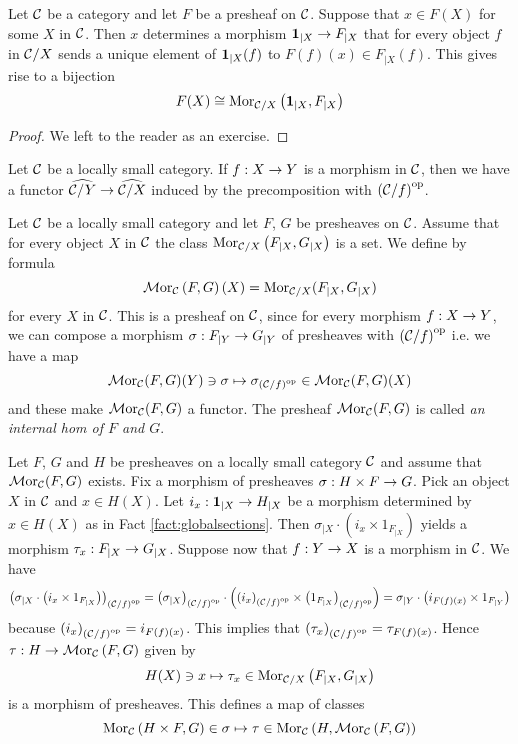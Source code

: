 \begin{fact}\label{fact:globalsections}
Let ${\mathcal C}$ be a category and let $F$ be a presheaf on ${\mathcal C}$. Suppose that $x\in F(X)$ for some $X$ in ${\mathcal C}$. Then $x$ determines a morphism $\mathbf{1}_{\mid X}\rightarrow F_{\mid X}$ that for every object $f$ in ${\mathcal C}/X$ sends a unique element of $\mathbf{1}_{\mid X}(f)$ to $F(f)(x)\in F_{\mid X}(f)$. This gives rise to a bijection
$$F(X)\cong \mathrm{Mor}_{{\mathcal C}/X}\left(\mathbf{1}_{\mid X},F_{\mid X}\right)$$
\end{fact}
\begin{proof}
We left to the reader as an exercise.
\end{proof}
\noindent
Let ${\mathcal C}$ be a locally small category. If $f:X\rightarrow Y$ is a morphism in ${\mathcal C}$, then we have a functor $\widehat{{\mathcal C}/Y}\rightarrow \widehat{{\mathcal C}/X}$ induced by the precomposition with $\left({\mathcal C}/f\right)^{\mathrm{op}}$.

\begin{definition}
Let ${\mathcal C}$ be a locally small category and let $F$, $G$ be presheaves on ${\mathcal C}$. Assume that for every object $X$ in ${\mathcal C}$ the class $\mathrm{Mor}_{{\mathcal C}/X}\left(F_{\mid X},G_{\mid X}\right)$ is a set. We define by formula
$$\mathcal{M}\mathrm{or}_{{\mathcal C}}\left(F,G\right)(X) = \mathrm{Mor}_{{\mathcal C}/X}(F_{\mid X},G_{\mid X})$$
for every $X$ in ${\mathcal C}$. This is a presheaf on ${\mathcal C}$, since for every morphism $f:X\rightarrow Y$, we can compose a morphism $\sigma:F_{\mid Y}\rightarrow G_{\mid Y}$ of presheaves with $\left({\mathcal C}/f\right)^{\mathrm{op}}$ i.e. we have a map 
$$\mathcal{M}\mathrm{or}_{{\mathcal C}}(F,G)(Y)\ni \sigma \mapsto \sigma_{\left({\mathcal C}/f\right)^{\mathrm{op}}}\in \mathcal{M}\mathrm{or}_{{\mathcal C}}(F,G)(X)$$
and these make $\mathcal{M}\mathrm{or}_{{\mathcal C}}(F,G)$ a functor. The presheaf $\mathcal{M}\mathrm{or}_{{\mathcal C}}(F,G)$ is called \textit{an internal hom of $F$ and $G$}.
\end{definition}
\noindent
Let $F$, $G$ and $H$ be presheaves on a locally small category ${\mathcal C}$ and assume that $\mathcal{M}\mathrm{or}_{{\mathcal C}}(F,G)$ exists. Fix a morphism of presheaves $\sigma:H\times F\rightarrow G$. Pick an object $X$ in ${\mathcal C}$ and $x\in H(X)$. Let $i_x:\mathbf{1}_{\mid X}\rightarrow H_{\mid X}$ be a morphism determined by $x\in H(X)$ as in Fact \ref{fact:globalsections}. Then $\sigma_{\mid X}\cdot \left(i_x\times 1_{F_{\mid X}}\right)$ yields a morphism $\tau_x:F_{\mid X}\rightarrow G_{\mid X}$. Suppose now that $f:Y\rightarrow X$ is a morphism in ${\mathcal C}$. We have 
$$\left(\sigma_{\mid X}\cdot \left(i_{x}\times 1_{F_{\mid X}}\right)\right)_{\left({\mathcal C}/f\right)^{\mathrm{op}}} = \left(\sigma_{\mid X}\right)_{\left({\mathcal C}/f\right)^{\mathrm{op}}}\cdot \left(\left(i_x\right)_{\left({\mathcal C}/f\right)^{\mathrm{op}}}\times \left(1_{F_{\mid X}}\right)_{\left({\mathcal C}/f\right)^{\mathrm{op}}}\right) = \sigma_{\mid Y}\cdot \left(i_{F(f)(x)}\times 1_{F_{\mid Y}}\right)$$
because $\left(i_x\right)_{\left({\mathcal C}/f\right)^{\mathrm{op}}} = i_{F(f)(x)}$. This implies that $\left(\tau_x\right)_{\left({\mathcal C}/f\right)^{\mathrm{op}}} = \tau_{F(f)(x)}$. Hence $\tau:H\rightarrow \mathcal{M}\mathrm{or}_{{\mathcal C}}\left(F,G\right)$ given by 
$$H(X)\ni x\mapsto \tau_x\in \mathrm{Mor}_{{\mathcal C}/X}\left(F_{\mid X},G_{\mid X}\right)$$
is a morphism of presheaves. This defines a map of classes
$$\mathrm{Mor}_{{\mathcal C}}\left(H\times F, G\right)\in \sigma \mapsto \tau \in \mathrm{Mor}_{{\mathcal C}}\left(H,\mathcal{M}\mathrm{or}_{{\mathcal C}}\left(F,G\right)\right)$$

